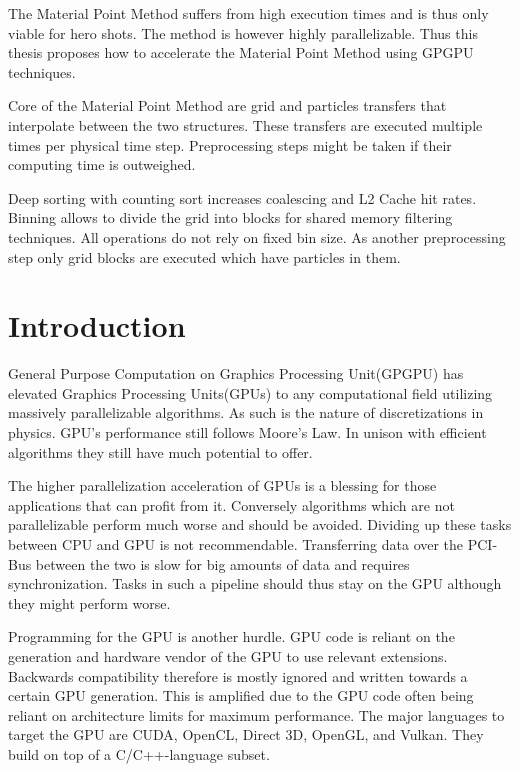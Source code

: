 \documentclass[m,times]{cgMA}
\begin{document}
\noindent The Material Point Method suffers from high execution times and is thus only viable for hero shots. The method is however highly parallelizable. Thus this thesis proposes how to accelerate the Material Point Method using GPGPU techniques.

\noindent Core of the Material Point Method are grid and particles transfers that interpolate between the two structures. These transfers are executed multiple times per physical time step. Preprocessing steps might be taken if their computing time is outweighed.

\noindent Deep sorting with counting sort increases coalescing and L2 Cache hit rates. Binning allows to divide the grid into blocks for shared memory filtering techniques. All operations do not rely on fixed bin size. As another preprocessing step only grid blocks are executed which have particles in them.
\vfill
\clearpage
\tableofcontents

\clearpage         %
{}


\section{Introduction} \label{intro}
General Purpose Computation on Graphics Processing Unit(GPGPU) has elevated Graphics Processing Units(GPUs) to any computational field utilizing massively parallelizable algorithms. As such is the nature of discretizations in physics. GPU's performance still follows Moore's Law. In unison with efficient algorithms they still have much potential to offer.

The higher parallelization acceleration of GPUs is a blessing for those applications that can profit from it. Conversely algorithms which are not parallelizable perform much worse and should be avoided. Dividing up these tasks between CPU and GPU is not recommendable. Transferring data over the PCI-Bus between the two is slow for big amounts of data and requires synchronization. Tasks in such a pipeline should thus stay on the GPU although they might perform worse.

Programming for the GPU is another hurdle. GPU code is reliant on the generation and hardware vendor of the GPU to use relevant extensions. Backwards compatibility therefore is mostly ignored and written towards a certain GPU generation. This is amplified due to the GPU code often being reliant on architecture limits for maximum performance. The major languages to target the GPU are CUDA, OpenCL, Direct 3D, OpenGL, and Vulkan. They build on top of a C/C++-language subset.
\end{document}
